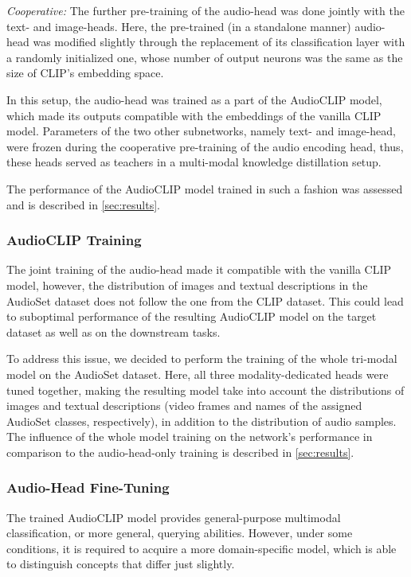 \documentclass[runningheads]{llncs}
\begin{document}
\emph{Cooperative:} The further pre-training of the audio-head was done jointly with the text- and image-heads.
Here, the pre-trained (in a standalone manner) audio-head was modified slightly through the replacement of its classification layer with a randomly initialized one, whose number of output neurons was the same as the size of \mbox{CLIP's} embedding space.

In this setup, the audio-head was trained as a part of the \mbox{AudioCLIP} model, which made its outputs compatible with the embeddings of the vanilla \mbox{CLIP} model.
Parameters of the two other subnetworks, namely text- and image-head, were frozen during the cooperative pre-training of the audio encoding head, thus, these heads served as teachers in a multi-modal knowledge distillation setup.

The performance of the \mbox{AudioCLIP} model trained in such a fashion was assessed and is described in \autoref{sec:results}.

\subsubsection{AudioCLIP Training} \label{sec:exp_setup:training:full_training}
The joint training of the audio-head made it compatible with the vanilla \mbox{CLIP} model, however, the distribution of images and textual descriptions in the \mbox{AudioSet} dataset does not follow the one from the \mbox{CLIP} dataset.
This could lead to suboptimal performance of the resulting \mbox{AudioCLIP} model on the target dataset as well as on the downstream tasks.

To address this issue, we decided to perform the training of the whole tri-modal model on the \mbox{AudioSet} dataset.
Here, all three modality-dedicated heads were tuned together, making the resulting model take into account the distributions of images and textual descriptions (video frames and names of the assigned \mbox{AudioSet} classes, respectively), in addition to the distribution of audio samples.
The influence of the whole model training on the network's performance in comparison to the audio-head-only training is described in \autoref{sec:results}.

\subsubsection{Audio-Head Fine-Tuning} \label{sec:exp_setup:training:ah_tuning}
The trained \mbox{AudioCLIP} model provides general-purpose multimodal classification, or more general, querying abilities.
However, under some conditions, it is required to acquire a more domain-specific model, which is able to distinguish concepts that differ just slightly.
\end{document}
